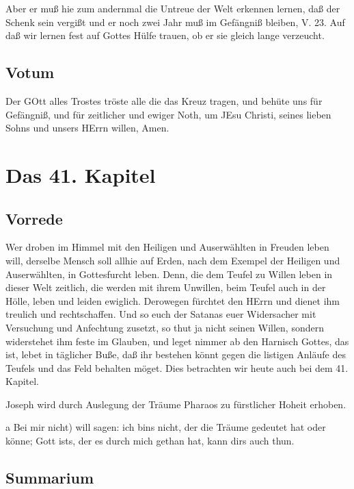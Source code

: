 Aber er muß hie zum andernmal die Untreue der Welt erkennen lernen, daß der Schenk sein vergißt und er noch zwei Jahr muß im Gefängniß bleiben, V. 23. Auf daß wir lernen fest auf Gottes Hülfe trauen, ob er sie gleich lange verzeucht.

\section{Votum}

Der GOtt alles Trostes tröste alle die das Kreuz tragen, und behüte uns für Gefängniß, und für zeitlicher und ewiger Noth, um JEsu Christi, seines lieben Sohns und unsers HErrn willen, Amen.

\chapter{Das 41. Kapitel}

\section{Vorrede}

Wer droben im Himmel mit den Heiligen und Auserwählten in Freuden leben will, derselbe Mensch soll allhie auf Erden, nach dem Exempel der Heiligen und Auserwählten, in Gottesfurcht leben. Denn, die dem Teufel zu Willen leben in dieser Welt zeitlich, die werden mit ihrem Unwillen, beim Teufel auch in der Hölle, leben und leiden ewiglich. Derowegen fürchtet den HErrn und dienet ihm treulich und rechtschaffen. Und so euch der Satanas euer Widersacher mit Versuchung und Anfechtung zusetzt, so thut ja nicht seinen Willen, sondern widerstehet ihm feste im Glauben, und leget nimmer ab den Harnisch Gottes, das ist, lebet in täglicher Buße, daß ihr bestehen könnt gegen die listigen Anläufe des Teufels und das Feld behalten möget. Dies betrachten wir heute auch bei dem 41. Kapitel.

Joseph wird durch Auslegung der Träume Pharaos zu fürstlicher Hoheit erhoben.

a Bei mir nicht) will sagen: ich bins nicht, der die Träume gedeutet hat oder könne; Gott ists, der es durch mich gethan hat, kann dirs auch thun.

\section{Summarium}

